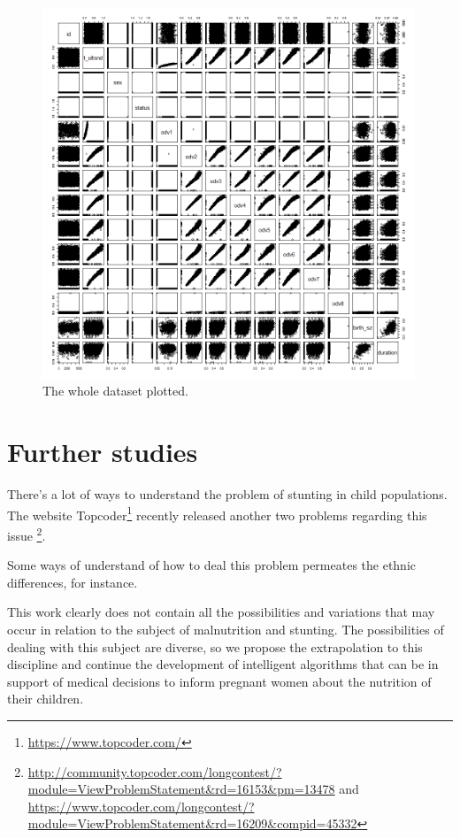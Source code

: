 \documentclass[10pt,twocolumn,letterpaper]{article}
\begin{document}
\begin{figure}
\begin{center}
	\includegraphics[width=0.99\textwidth]{pics/plot-data-1000}
	\caption{The whole dataset plotted.\label{fig:dataset_full}}   
\end{center} 
\end{figure} 

\section{Further studies}

There's a lot of ways to understand the problem of stunting in child populations. The website Topcoder\footnote{\url{https://www.topcoder.com/}} recently released another two problems regarding this issue \footnote{\url{http://community.topcoder.com/longcontest/?module=ViewProblemStatement&rd=16153&pm=13478} and \url{https://www.topcoder.com/longcontest/?module=ViewProblemStatement&rd=16209&compid=45332}}.

Some ways of understand of how to deal this problem permeates the ethnic differences, for instance. 

This work clearly does not contain all the possibilities and variations that may occur in relation to the subject of malnutrition and stunting. The possibilities of dealing with this subject are diverse, so we propose the extrapolation to this discipline and continue the development of intelligent algorithms that can be in support of medical decisions to inform pregnant women about the nutrition of their children.
\end{document}
